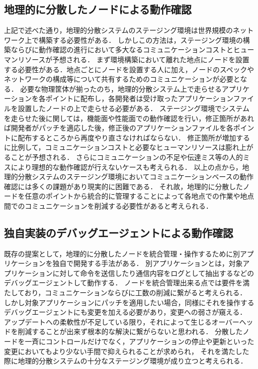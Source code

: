 \subsection{地理的に分散したノードによる動作確認}
上記で述べた通り，地理的分散システムのステージング環境は世界規模のネットワーク上で構築する必要性がある．
しかしこの方法は，ステージング環境の構築ならびに動作確認の進行において多大なるコミュニケーションコストとヒューマンリソースが予想される．
まず環境構築において離れた地点にノードを設置する必要性がある．地点ごとにノードを設置する人に加え，ノードのスペックやネットワークの構成等について共有するためのコミュニケーションが必要となる．
必要な物理筐体が揃ったのち，地理的分散システム上で走らせるアプリケーションを各ポイントに配布し，各開発者は受け取ったアプリケーションファイルを設置したノードの上で走らせる必要がある．
ステージング環境でシステムを走らせた後に関しては，機能面や性能面での動作確認を行い，修正箇所があれば開発者がパッチを適応した後，修正後のアプリケーションファイルを各ポイントに配布するところから再度やり直さなければならない．
修正箇所が増加するに比例して，コミュニケーションコストと必要なヒューマンリソースは膨れ上がることが予想される．
さらにコミュニケーションの不足や伝達ミス等の人的ミスにより理想的な動作確認が行えないケースも考えられる．
以上の点から，地理的分散システムのステージング環境においてコミュニケーションベースの動作確認には多くの課題があり現実的に困難である．
それ故，地理的に分散したノードを任意のポイントから統合的に管理することによって各地点での作業や地点間でのコミュニケーションを削減する必要性があると考えられる．

\subsection{独自実装のデバッグエージェントによる動作確認}
既存の提案として，地理的に分散したノードを統合管理・操作するために別アプリケーションを独自で開発する手法がある．
別アプリケーションとは，対象アプリケーションに対して命令を送信したり通信内容をログとして抽出するなどのデバッグエージェントして動作する．
ノードを統合管理出来る点では要件を満たしており，コミュニケーションならびに工数の削減に繋がると考えられる．
しかし対象アプリケーションにパッチを適用したい場合，同様にそれを操作するデバッグエージェントにも変更を加える必要があり，変更への弱さが窺える．
アップデートへの柔軟性が不足している限り，それによって生じるオーバーヘッドを削減することが出来ず根本的な解決に繋がらないと思われる．
分散したノードを一斉にコントロールだけでなく，アプリケーションの停止や更新といった変更においてもより少ない手間で抑えられることが求められ，
それを満たした際に地理的分散システムの十分なステージング環境が成り立つと考えられる．

